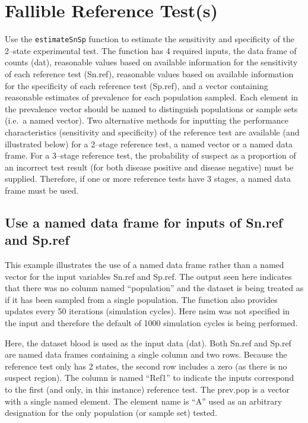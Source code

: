 \documentclass[
  12pt,
]{article}
\begin{document}
\section{Fallible Reference Test(s)}\label{fallible-reference-tests}

Use the \texttt{estimateSnSp} function to estimate the sensitivity and
specificity of the 2--state experimental test. The function has 4
required inputs, the data frame of counts (dat), reasonable values based
on available information for the sensitivity of each reference test
(Sn.ref), reasonable values based on available information for the
specificity of each reference test (Sp.ref), and a vector containing
reasonable estimates of prevalence for each population sampled. Each
element in the prevalence vector should be named to distinguish
populations or sample sets (i.e.~a named vector). Two alternative
methods for inputting the performance characteristics (sensitivity and
specificity) of the reference test are available (and illustrated below)
for a 2--stage reference test, a named vector or a named data frame. For
a 3--stage reference test, the probability of suspect as a proportion of
an incorrect test result (for both disease positive and disease
negative) must be supplied. Therefore, if one or more reference tests
have 3 stages, a named data frame must be used.

\subsection{Use a named data frame for inputs of Sn.ref and
Sp.ref}\label{use-a-named-data-frame-for-inputs-of-sn.ref-and-sp.ref}

This example illustrates the use of a named data frame rather than a
named vector for the input variables Sn.ref and Sp.ref. The output seen
here indicates that there was no column named ``population'' and the
dataset is being treated as if it has been sampled from a single
population. The function also provides updates every 50 iterations
(simulation cycles). Here nsim was not specified in the input and
therefore the default of 1000 simulation cycles is being performed.

Here, the dataset blood is used as the input data (dat). Both Sn.ref and
Sp.ref are named data frames containing a single column and two rows.
Because the reference test only has 2 states, the second row includes a
zero (as there is no suspect region). The column is named ``Ref1'' to
indicate the inputs correspond to the first (and only, in this instance)
reference test. The prev.pop is a vector with a single named element.
The element name is ``A'' used as an arbitrary designation for the only
population (or sample set) tested.
\end{document}
